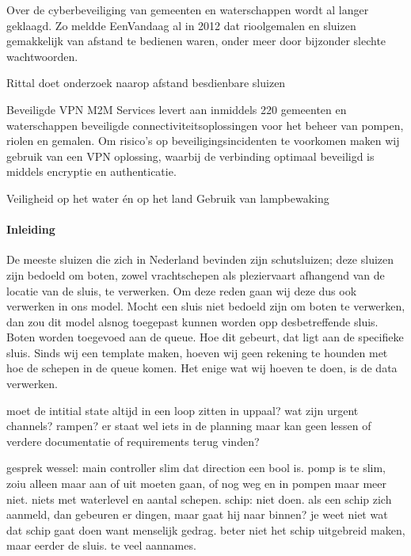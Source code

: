 \cite{cybersecWaterwerk}
Over de cyberbeveiliging van gemeenten en waterschappen wordt al langer geklaagd. Zo meldde EenVandaag al in 2012 dat rioolgemalen en sluizen gemakkelijk van afstand te bedienen waren, onder meer door bijzonder slechte wachtwoorden.
 
\cite{cybersecWaterschappen}
Rittal doet onderzoek naarop afstand besdienbare sluizen
 
\cite{cybersecZuidHolland}
Beveiligde VPN
M2M Services levert aan inmiddels 220 gemeenten en waterschappen beveiligde connectiviteitsoplossingen voor het beheer van pompen, riolen en gemalen. Om risico’s op beveiligingsincidenten te voorkomen maken wij gebruik van een VPN oplossing, waarbij de verbinding optimaal beveiligd is middels encryptie en authenticatie.
 
\cite{waterwerkNED}
Veiligheid op het water én op het land
Gebruik van lampbewaking 
 
\cite{veiligheidwaterland} 


 


\paragraph{Inleiding}




De meeste sluizen die zich in Nederland bevinden zijn schutsluizen; deze sluizen zijn bedoeld om boten, zowel vrachtschepen als pleziervaart afhangend van de locatie van de sluis, te verwerken. Om deze reden gaan wij deze dus ook verwerken in ons model. Mocht een sluis niet bedoeld zijn om boten te verwerken, dan zou dit model alsnog toegepast kunnen worden opp desbetreffende sluis.
Boten worden toegevoed aan de queue. Hoe dit gebeurt, dat ligt aan de specifieke sluis.  Sinds wij een template maken, hoeven wij geen rekening te hounden met hoe de schepen in de queue komen. Het enige wat wij hoeven te doen, is de data verwerken.



moet de intitial state altijd in een loop zitten in uppaal?
wat zijn urgent channels?
rampen? er staat wel iets in de planning maar kan geen lessen of verdere documentatie of requirements terug vinden?	


gesprek wessel:
main controller slim dat direction een bool is. 
pomp is te slim, zoiu alleen maar aan of uit moeten gaan, of nog weg en in pompen maar meer niet. niets met waterlevel en aantal schepen.
schip: niet doen. als een schip zich aanmeld, dan gebeuren er dingen, maar gaat hij naar binnen? je weet niet wat dat schip gaat doen want menselijk gedrag. beter niet het schip uitgebreid maken, maar eerder de sluis. te veel aannames.

